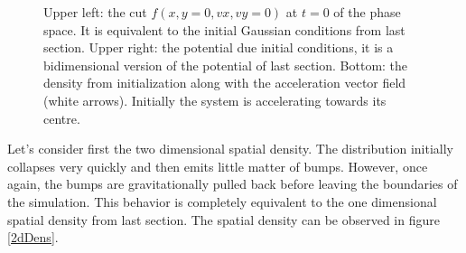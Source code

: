 \begin{figure}[h!]
    \caption{Upper left: the cut $f(x,y=0,vx,vy=0)$ at $t=0$ of the phase space. It is equivalent to the initial Gaussian conditions from last section. Upper right: the potential due initial conditions, it is a bidimensional version of the potential of last section. Bottom: the density from initialization along with the acceleration vector field (white arrows). Initially the system is accelerating towards its centre. }
    \label{2dInit}
\end{figure}

Let's consider first the two dimensional spatial density. The distribution initially collapses very quickly and then emits little matter of bumps. However, once again, the bumps are gravitationally pulled back before leaving the boundaries of the simulation. This behavior is completely equivalent to the one dimensional spatial density from last section. The spatial density can be observed in figure \ref{2dDens}.

